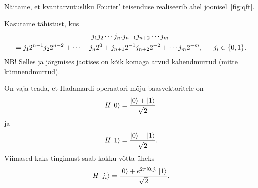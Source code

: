 \documentclass[12pt]{report}
\def\ket#1{\mathinner{|#1\rangle}}
\newcommand{\comment}[1]{}
\begin{document}
\comment{
\begin{figure}
    \centering
    \begin{tikzpicture}[scale=0.8]
        \begin{yquant}
            qubit {\(\ket{j_1}\)} q[1];
            qubit {\(\ket{j_2}\)} q[+1];
            qubit {\(\vdots\)} q[+1]; discard q[2];
            qubit {\(\ket{j_{n-1}}\)} q[+1];
            qubit {\(\ket{j_n}\)} q[+1];

            h q[0];
            box {\(P(2\pi/2^2)\)} q[0] | q[1];
            text {\(\ \ldots\ \)} q[0, 1, 3, 4];

            h q[1];
            text {\(\ \ldots\ \)} q[0, 1, 3, 4];
            box {\(P(2\pi/2^{n-2})\)} q[1] | q[3];
            box {\(P(2\pi/2^{n-1})\)} q[1] | q[4];

            text {\(\ \ldots\ \)} q[0, 1, 3, 4];
            h q[3];
            box {\(P(2\pi/2^2\)} q[3] | q[4];

            h q[4];

            swap (q[0, 4]);
            swap (q[1, 3]);

            output {\(\frac{\ket0+e^{2\pi0.j_n}\ket1}{\sqrt{2}}\)} q[0];
            output {\(\frac{\ket0+e^{2\pi0.j_{n-1}j_n}\ket1}{\sqrt{2}}\)} q[1];
            output {\(\vdots\)} q[2];
            output {\(\frac{\ket0+e^{2\pi0.j_2\cdots j_n}\ket1}{\sqrt{2}}\)} q[3];
            output {\(\frac{\ket0+e^{2\pi0.j_1\cdots j_n}\ket1}{\sqrt{2}}\)} q[4];
        \end{yquant}
    \end{tikzpicture}
    \caption{Kvantarvutusliku Fourier' teisneduse ahel~\cite{nielsen+chuang, kaye+laflamme+mosca}}
    \label{fig:qft}
\end{figure}
}

Näitame, et kvantarvutusliku Fourier' teisenduse realiseerib ahel joonisel~\ref{fig:qft}.

Kasutame tähistust, kus
\begin{multline}
    j_1j_2\cdots j_n.j_{n+1}j_{n+2}\cdots j_m \\
    = j_1 2^{n-1} j_2 2^{n-2} + \cdots + j_n 2^0 + j_{n+1} 2^{-1} j_{n+2} 2^{-2} + \cdots j_m 2^{-m} \rlap{,}
    \qquad j_i \in \{0, 1\} \rlap{.}
\end{multline}
NB! Selles ja järgmises jaotises on kõik komaga arvud kahendmurrud (mitte kümnendmurrud).

On vaja teada, et Hadamardi operaatori mõju baasvektoritele on
\begin{align}
    H\ket{0} = \frac{\ket{0} + \ket{1}}{\sqrt{2}}
\end{align}
ja
\begin{align}
    H\ket{1} = \frac{\ket{0} - \ket{1}}{\sqrt{2}} \rlap{.}
\end{align}
Viimased kaks tingimust saab kokku võtta üheks
\begin{align}
    H\ket{j_i} = \frac{\ket{0} + e^{2\pi i0.j_i}\ket{1}}{\sqrt{2}}\rlap{.}
\end{align}
\end{document}
